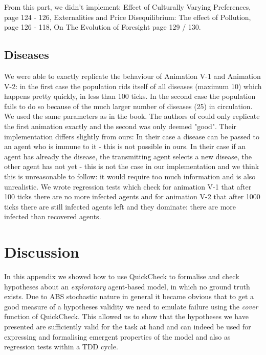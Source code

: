 From this part, we didn't implement: Effect of Culturally Varying Preferences, page 124 - 126, Externalities and Price Disequilibrium: The effect of Pollution, page 126 - 118, On The Evolution of Foresight page 129 / 130. 


\subsection{Diseases}
We were able to exactly replicate the behaviour of Animation V-1 and Animation V-2: in the first case the population rids itself of all diseases (maximum 10) which happens pretty quickly, in less than 100 ticks. In the second case the population fails to do so because of the much larger number of diseases (25) in circulation. We used the same parameters as in the book. 
The authors of \cite{weaver_replicating_2009} could only replicate the first animation exactly and the second was only deemed "good". Their implementation differs slightly from ours: In their case a disease can be passed to an agent who is immune to it - this is not possible in ours. In their case if an agent has already the disease, the transmitting agent selects a new disease, the other agent has not yet - this is not the case in our implementation and we think this is unreasonable to follow: it would require too much information and is also unrealistic.
We wrote regression tests which check for animation V-1 that after 100 ticks there are no more infected agents and for animation V-2 that after 1000 ticks there are still infected agents left and they dominate: there are more infected than recovered agents.

\section{Discussion}
In this appendix we showed how to use QuickCheck to formalise and check hypotheses about an \textit{exploratory} agent-based model, in which no ground truth exists. Due to ABS stochastic nature in general it became obvious that to get a good measure of a hypotheses validity we need to emulate failure using the \textit{cover} function of QuickCheck. This allowed us to show that the hypotheses we have presented are sufficiently valid for the task at hand and can indeed be used for expressing and formalising emergent properties of the model and also as regression tests within a TDD cycle.

